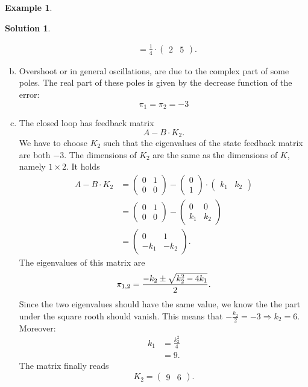 \documentclass[a4paper,12 pt]{article}
\numberwithin{equation}{section}
\theoremstyle{definition}
\newtheorem{bsp}{Example}
\theoremstyle{remark}
\theoremstyle{definition}
\newtheorem*{lsg}{Solution}
\theoremstyle{definition}
\theoremstyle{definition}
\theoremstyle{remark}
\begin{document}
\begin{bsp}
\begin{lsg}
\begin{enumerate}[(a)]
\begin{equation*}
\begin{split}
 &= \frac{1}{4}\cdot \begin{pmatrix} 2&5\end{pmatrix}.
 \end{split}
\end{equation*}
\item Overshoot or in general oscillations, are due to the complex part of some poles. The real part of these poles is given by the decrease function of the error: $$\pi_1=\pi_2=-3$$
\item The closed loop has feedback matrix 
$$A-B\cdot K_2.$$
We have to choose $K_2$ such that the eigenvalues of the state feedback matrix are both $-3$. The dimensions of $K_2$ are the same as the dimensions of $K$, namely $1\times 2$. It holds
\begin{equation*}
\begin{split}
A-B\cdot K_2&=\begin{pmatrix} 0&1\\ 0&0 \end{pmatrix} -\begin{pmatrix} 0\\ 1 \end{pmatrix} \cdot \begin{pmatrix}k_1& k_2 \end{pmatrix}\\
&= \begin{pmatrix} 0&1\\ 0&0 \end{pmatrix}-\begin{pmatrix} 0&0\\ k_1 & k_2 \end{pmatrix}\\
&=\begin{pmatrix}
0&1\\ -k_1&-k_2
\end{pmatrix}.
\end{split}
\end{equation*}
The eigenvalues of this matrix are
\begin{equation*}
\pi_{1,2}=\frac{-k_2\pm \sqrt{k_2^2-4k_1}}{2}.\\
\end{equation*}
Since the two eigenvalues should have the same value, we know the the part under the square rooth should vanish. This means that $-\frac{k_2}{2}=-3 \Rightarrow k_2=6$. Moreover:
\begin{equation*}
\begin{split}
k_1&=\frac{k_2^2}{4}\\
&=9.
\end{split}
\end{equation*}
The matrix finally reads
\begin{equation*}
K_2=\begin{pmatrix} 9&6\end{pmatrix}.
\end{equation*}
\end{enumerate}
\end{lsg}
\end{bsp}
\newpage
\end{document}
